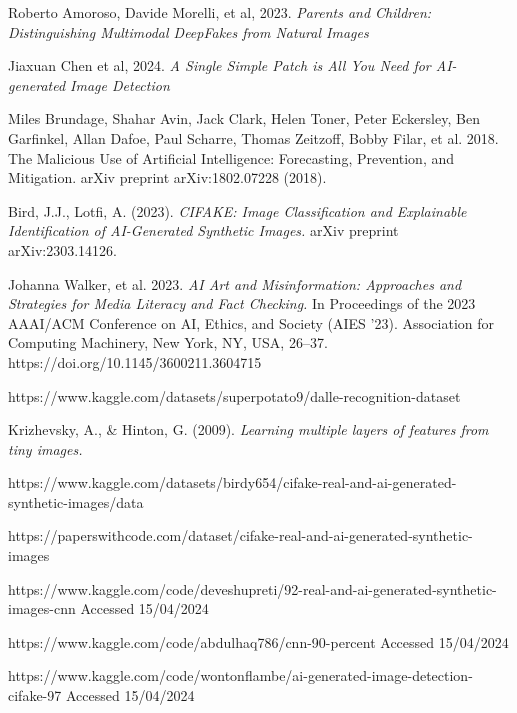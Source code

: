 \documentclass[12pt,letter]{article}
\begin{document}
\newpage
\begin{thebibliography}{}

Roberto Amoroso, Davide Morelli, et al, 2023. \textit{Parents and Children: Distinguishing Multimodal DeepFakes from Natural Images}

Jiaxuan Chen et al, 2024. \textit{A Single Simple Patch is All You Need for AI-generated Image Detection}

Miles Brundage, Shahar Avin, Jack Clark, Helen Toner, Peter Eckersley, Ben Garfinkel, Allan Dafoe, Paul Scharre,
Thomas Zeitzoff, Bobby Filar, et al. 2018. The Malicious Use of Artificial Intelligence: Forecasting, Prevention, and
Mitigation. arXiv preprint arXiv:1802.07228 (2018).

Bird, J.J., Lotfi, A. (2023). \textit{CIFAKE: Image Classification and Explainable Identification of AI-Generated Synthetic Images.} arXiv preprint arXiv:2303.14126.

Johanna Walker, et al. 2023. \textit{AI Art and Misinformation: Approaches and Strategies for Media Literacy and Fact Checking.} In Proceedings of the 2023 AAAI/ACM Conference on AI, Ethics, and Society (AIES '23). Association for Computing Machinery, New York, NY, USA, 26–37. https://doi.org/10.1145/3600211.3604715

https://www.kaggle.com/datasets/superpotato9/dalle-recognition-dataset

Krizhevsky, A., \& Hinton, G. (2009). \textit{Learning multiple layers of features from tiny images.}

https://www.kaggle.com/datasets/birdy654/cifake-real-and-ai-generated-synthetic-images/data

https://paperswithcode.com/dataset/cifake-real-and-ai-generated-synthetic-images

https://www.kaggle.com/code/deveshupreti/92-real-and-ai-generated-synthetic-images-cnn \newline Accessed 15/04/2024

https://www.kaggle.com/code/abdulhaq786/cnn-90-percent \newline Accessed 15/04/2024

https://www.kaggle.com/code/wontonflambe/ai-generated-image-detection-cifake-97 \newline Accessed 15/04/2024

\end{thebibliography}
\end{document}
